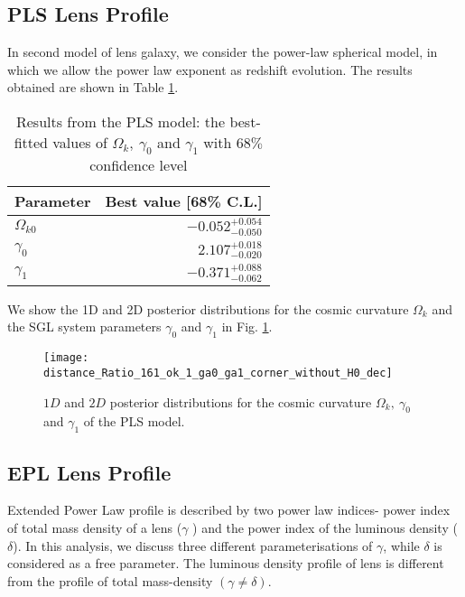 \documentclass[12pt]{report}
\begin{document}
\subsection{PLS Lens Profile}
In second model of lens galaxy, we consider the power-law spherical model, in which we allow the power law exponent as redshift evolution. The results obtained are shown in Table \ref{tb:sl2}. 
\begin{table}[h!]
\centering
\begin{large}
    \begin{tabular}[b]{| l | r |}\hline
       Parameter & Best value [68\% C.L.] \\ \hline \hline
    $\Omega_{k0}$ & $-0.052^{+0.054}_{-0.050} $ \\ \hline
   $\gamma_0$ & $2.107^{+0.018}_{-0.020}$ \\ \hline
   $\gamma_1$ & $-0.371^{+0.088}_{-0.062}$ \\ \hline
    \end{tabular}
\end{large}
\caption{Results from the PLS model: the best-fitted values of $\Omega_k,~\gamma_0$ and $\gamma_1$ with $68\%$ confidence level }
\label{tb:sl2}
\end{table}
We show the 1D and 2D posterior distributions for the cosmic curvature $\Omega_k$ and the SGL system parameters $\gamma_0$ and $\gamma_1$ in Fig. \ref{fig:sl3}.
\begin{figure}[H]
    \centering
    \texttt{[image: distance\_Ratio\_161\_ok\_1\_ga0\_ga1\_corner\_without\_H0\_dec]}
    \caption{$1D$ and $2D$ posterior distributions for the cosmic curvature $\Omega_k,~ \gamma_0$ and $\gamma_1$ of the PLS model.}
    \label{fig:sl3}
\end{figure}
\subsection{EPL Lens Profile}
Extended Power Law profile  is described by two power law indices- power index of total mass density of a lens ($\gamma$ ) and the power index of the luminous density ($\delta$). In this analysis, we discuss three different parameterisations of $\gamma$, while $\delta$ is considered as a free parameter. The luminous density profile of lens is different from the profile of total mass-density $(\gamma\neq\delta)$. 
\end{document}
